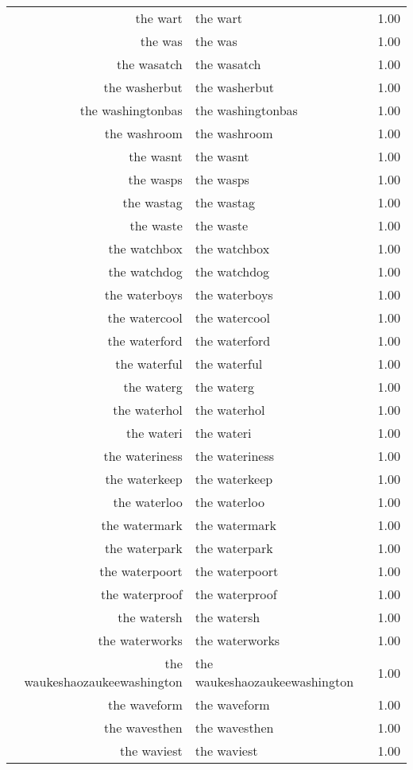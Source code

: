 \begin{table}[ht]
\begin{tabular}{rlr}
  the wart & the wart & 1.00 \\ 
  the was & the was & 1.00 \\ 
  the wasatch & the wasatch & 1.00 \\ 
  the washerbut & the washerbut & 1.00 \\ 
  the washingtonbas & the washingtonbas & 1.00 \\ 
  the washroom & the washroom & 1.00 \\ 
  the wasnt & the wasnt & 1.00 \\ 
  the wasps & the wasps & 1.00 \\ 
  the wastag & the wastag & 1.00 \\ 
  the waste & the waste & 1.00 \\ 
  the watchbox & the watchbox & 1.00 \\ 
  the watchdog & the watchdog & 1.00 \\ 
  the waterboys & the waterboys & 1.00 \\ 
  the watercool & the watercool & 1.00 \\ 
  the waterford & the waterford & 1.00 \\ 
  the waterful & the waterful & 1.00 \\ 
  the waterg & the waterg & 1.00 \\ 
  the waterhol & the waterhol & 1.00 \\ 
  the wateri & the wateri & 1.00 \\ 
  the wateriness & the wateriness & 1.00 \\ 
  the waterkeep & the waterkeep & 1.00 \\ 
  the waterloo & the waterloo & 1.00 \\ 
  the watermark & the watermark & 1.00 \\ 
  the waterpark & the waterpark & 1.00 \\ 
  the waterpoort & the waterpoort & 1.00 \\ 
  the waterproof & the waterproof & 1.00 \\ 
  the watersh & the watersh & 1.00 \\ 
  the waterworks & the waterworks & 1.00 \\ 
  the waukeshaozaukeewashington & the waukeshaozaukeewashington & 1.00 \\ 
  the waveform & the waveform & 1.00 \\ 
  the wavesthen & the wavesthen & 1.00 \\ 
  the waviest & the waviest & 1.00 \\ 

\end{tabular}
\end{table}
